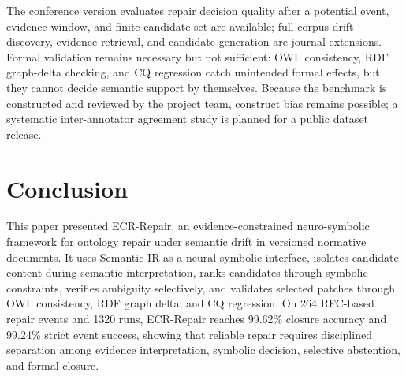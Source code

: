 \documentclass[conference]{IEEEtran}
\begin{document}
The conference version evaluates repair decision quality after a potential event, evidence window, and finite candidate set are available; full-corpus drift discovery, evidence retrieval, and candidate generation are journal extensions. Formal validation remains necessary but not sufficient: OWL consistency, RDF graph-delta checking, and CQ regression catch unintended formal effects, but they cannot decide semantic support by themselves. Because the benchmark is constructed and reviewed by the project team, construct bias remains possible; a systematic inter-annotator agreement study is planned for a public dataset release.

\section{Conclusion}

This paper presented ECR-Repair, an evidence-constrained neuro-symbolic framework for ontology repair under semantic drift in versioned normative documents. It uses Semantic IR as a neural-symbolic interface, isolates candidate content during semantic interpretation, ranks candidates through symbolic constraints, verifies ambiguity selectively, and validates selected patches through OWL consistency, RDF graph delta, and CQ regression. On 264 RFC-based repair events and 1320 runs, ECR-Repair reaches 99.62\% closure accuracy and 99.24\% strict event success, showing that reliable repair requires disciplined separation among evidence interpretation, symbolic decision, selective abstention, and formal closure.



\end{document}

